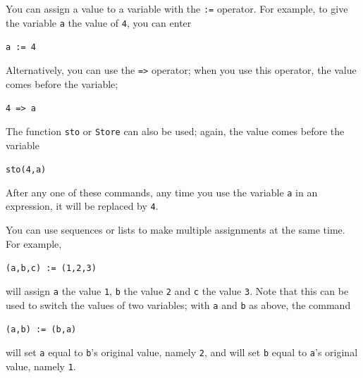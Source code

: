 \documentclass[a4paper,11pt]{book}
\begin{document}
You can assign a value to a variable with the \texttt{:=}\index{:=}
operator. For example, to give the variable \texttt{a} the value of
\texttt{4}, you can enter
\begin{center}
  {\tt a := 4}
\end{center}
Alternatively, you can use the \texttt{=>}\index{=>} operator; when
you use this operator, the value comes before the variable;
\begin{center}
  {\tt 4 => a}
\end{center}
The function \texttt{sto} or \texttt{Store}
can also be used; again, the value comes before the variable
\begin{center}
  {\tt sto(4,a)}
\end{center}
After any one of these commands, any time you use the variable
\texttt{a} in an expression, it will be replaced by \texttt{4}.

You can use sequences or lists to make multiple assignments at the
same time. For example,
\begin{center}
{\tt (a,b,c) := (1,2,3)}
\end{center}
will assign \texttt{a} the value \texttt{1}, \texttt{b} the value
\texttt{2} and \texttt{c} the value \texttt{3}.   Note that this can
be used to switch the values of two variables; with \texttt{a} and
\texttt{b} as above, the command
\begin{center}
{\tt (a,b) := (b,a)}
\end{center}
will set \texttt{a} equal to \texttt{b}'s original value, namely
\texttt{2}, and will set \texttt{b} equal to \texttt{a}'s original
value, namely \texttt{1}.
\end{document}
